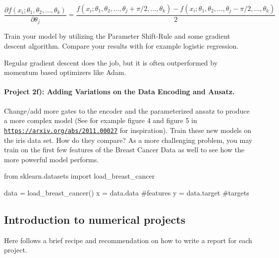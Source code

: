 \documentclass[%
oneside,                 %
final,                   %
10pt]{article}
\begin{document}
\begin{equation*}
    \frac{\partial f(x_i; \theta_1, \theta_2, \dots, \theta_k)}{\partial \theta_j}  = \frac{f(x_i; \theta_1, \theta_2, \dots, \theta_j + \pi /2, \dots, \theta_k) -f(x_i; \theta_1, \theta_2, \dots, \theta_j - \pi /2, \dots, \theta_k)}{2}
\end{equation*}

Train your model by utilizing the Parameter Shift-Rule and some
gradient descent algorithm. Compare your results with for example
logistic regression.

Regular gradient descent does the job, but it is often outperformed by momentum based optimizers like Adam.


\paragraph{Project 2f): Adding Variations on the Data Encoding and Ansatz.}
Change/add more gates to the encoder and the parameterized ansatz to produce a more complex model (See for example figure 4 and figure 5 in \href{{https://arxiv.org/abs/2011.00027}}{\nolinkurl{https://arxiv.org/abs/2011.00027}} for inspiration). Train these new models on the iris data set. How do they compare? As a more challenging problem, you may train on the first few features of the Breast Cancer Data as well to see how the more powerful model performs.

\begin{print}
from sklearn.datasets import load_breast_cancer

data = load_breast_cancer()
x = data.data #features
y = data.target #targets
\end{print}





\subsection*{Introduction to numerical projects}

Here follows a brief recipe and recommendation on how to write a report for each
project.
\end{document}
